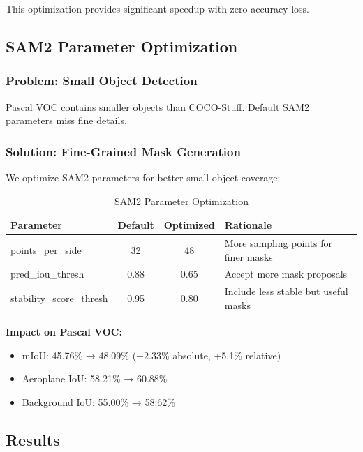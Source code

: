 This optimization provides significant speedup with zero accuracy loss.

\subsection{SAM2 Parameter Optimization}

\subsubsection{Problem: Small Object Detection}

Pascal VOC contains smaller objects than COCO-Stuff. Default SAM2 parameters miss fine details.

\subsubsection{Solution: Fine-Grained Mask Generation}

We optimize SAM2 parameters for better small object coverage:

\begin{table}[h]
\centering
\caption{SAM2 Parameter Optimization}
\label{tab:sam_params_opt}
\begin{tabular}{lccp{5cm}}
\hline
\textbf{Parameter} & \textbf{Default} & \textbf{Optimized} & \textbf{Rationale} \\
\hline
points\_per\_side & 32 & 48 & More sampling points for finer masks \\
pred\_iou\_thresh & 0.88 & 0.65 & Accept more mask proposals \\
stability\_score\_thresh & 0.95 & 0.80 & Include less stable but useful masks \\
\hline
\end{tabular}
\end{table}

\textbf{Impact on Pascal VOC:}
\begin{itemize}
    \item mIoU: 45.76\% → 48.09\% (+2.33\% absolute, +5.1\% relative)
    \item Aeroplane IoU: 58.21\% → 60.88\%
    \item Background IoU: 55.00\% → 58.62\%
\end{itemize}

\subsection{Results}

